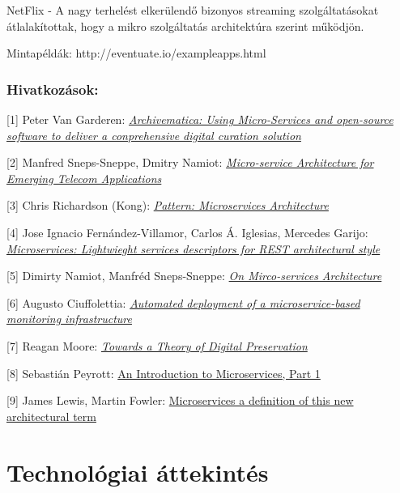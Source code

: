 \documentclass[11pt,magyar,a4paper,oneside,]{report}
\begin{document}
NetFlix - A nagy terhelést elkerülendő bizonyos streaming
szolgáltatásokat átlalakítottak, hogy a mikro szolgáltatás architektúra
szerint működjön.

Mintapéldák: http://eventuate.io/exampleapps.html

\subsection{Hivatkozások:}\label{hivatkozuxe1sok-1}

{[}1{]} Peter Van Garderen:
\href{http://citeseerx.ist.psu.edu/viewdoc/download?doi=10.1.1.384.7168\&rep=rep1\&type=pdf\#page=145}{\emph{Archivematica:
Using Micro-Services and open-source software to deliver a conprehensive
digital curation solution}}

{[}2{]} Manfred Sneps-Sneppe, Dmitry Namiot:
\href{http://injoit.ru/index.php/j1/article/view/161/119}{\emph{Micro-service
Architecture for Emerging Telecom Applications}}

{[}3{]} Chris Richardson (Kong):
\href{http://microservices.io/patterns/microservices.html}{\emph{Pattern:
Microservices Architecture}}

{[}4{]} Jose Ignacio Fernández-Villamor, Carlos Á. Iglesias, Mercedes
Garijo:
\href{http://oa.upm.es/8128/1/INVE_MEM_2010_81293.pdf}{\emph{Microservices:
Lightwieght services descriptors for REST architectural style}}

{[}5{]} Dimirty Namiot, Manfréd Sneps-Sneppe:
\href{http://cyberleninka.ru/article/n/on-micro-services-architecture}{\emph{On
Mirco-services Architecture}}

{[}6{]} Augusto Ciuffolettia:
\href{http://ac.els-cdn.com/S187705091503077X/1-s2.0-S187705091503077X-main.pdf?_tid=83f9a800-e3fa-11e5-9747-00000aacb35e\&acdnat=1457310260_fa7b3e651c221cf0307fbb2d6c7f59a6}{\emph{Automated
deployment of a microservice-based monitoring infrastructure}}

{[}7{]} Reagan Moore:
\href{http://ijdc.net/index.php/ijdc/article/view/63/42}{\emph{Towards a
Theory of Digital Preservation}}

{[}8{]} Sebastián Peyrott:
\href{https://auth0.com/blog/2015/09/04/an-introduction-to-microservices-part-1/}{An
Introduction to Microservices, Part 1}

{[}9{]} James Lewis, Martin Fowler:
\href{http://martinfowler.com/articles/microservices.html}{Microservices
a definition of this new architectural term}

\chapter{Technológiai
áttekintés}\label{technoluxf3giai-uxe1ttekintuxe9s}
\end{document}
